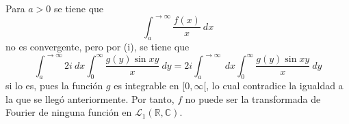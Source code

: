\documentclass[12pt]{report}
\newcounter{it}
\theoremstyle{largebreak}
\begin{document}
\begin{sol}
\begin{equation*}
\begin{split}
            \end{split}
        \end{equation*}
        Para $a>0$ se tiene que
        \begin{equation*}
            \int_{a}^{ \rightarrow\infty}\frac{f(x)}{x}\:dx
        \end{equation*}
        no es convergente, pero por (i), se tiene que
        \begin{equation*}
            \int_{a}^{\rightarrow\infty}2i\:dx \int_{0}^{\infty}\frac{g(y)\sin xy}{x}\:dy=2i\int_{a}^{\rightarrow\infty}\:dx\int_{0}^{\infty}\frac{g(y)\sin xy}{x}\:dy
        \end{equation*}
        si lo es, pues la función $g$ es integrable en $[0,\infty[$, lo cual contradice la igualdad a la que se llegó anteriormente. Por tanto, $f$ no puede ser la transformada de Fourier de ninguna función en $\mathcal{L}_1(\mathbb{R},\mathbb{C})$.
    \end{sol}
\end{document}
